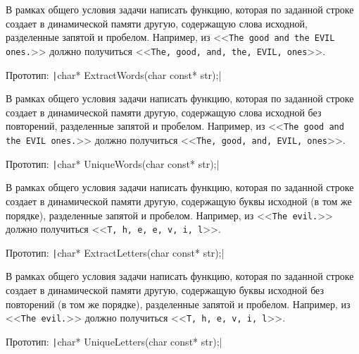 \zzsectionVARIATIONS


\begin{zztask}
В рамках общего условия задачи написать функцию, которая по заданной строке
создает в динамической памяти другую, содержащую слова исходной,
разделенные запятой и пробелом.
Например, из
<<\texttt{The good and the EVIL ones.}>>
должно получиться
<<\texttt{The, good, and, the, EVIL, ones}>>.

Прототип: \texttt|char* ExtractWords(char const* str);|
\end{zztask}

\begin{zztask}
В рамках общего условия задачи написать функцию, которая по заданной строке
создает в динамической памяти другую, содержащую слова исходной без
повторений, разделенные запятой и пробелом.
Например, из
<<\texttt{The good and the EVIL ones.}>>
должно получиться
<<\texttt{The, good, and, EVIL, ones}>>.


Прототип: \texttt|char* UniqueWords(char const* str);|
\end{zztask}

\begin{zztask}
В рамках общего условия задачи написать функцию, которая по заданной строке
создает в динамической памяти другую, содержащую буквы исходной (в том же
порядке), разделенные запятой и пробелом.
Например, из
<<\texttt{The evil.}>>
должно получиться
<<\texttt{T, h, e, e, v, i, l}>>.

Прототип: \texttt|char* ExtractLetters(char const* str);|
\end{zztask}

\begin{zztask}
В рамках общего условия задачи написать функцию, которая по заданной строке
создает в динамической памяти другую, содержащую буквы исходной без
повторений (в том же порядке), разделенные запятой и пробелом.
Например, из
<<\texttt{The evil.}>>
должно получиться
<<\texttt{T, h, e, v, i, l}>>.

Прототип: \texttt|char* UniqueLetters(char const* str);|
\end{zztask}

